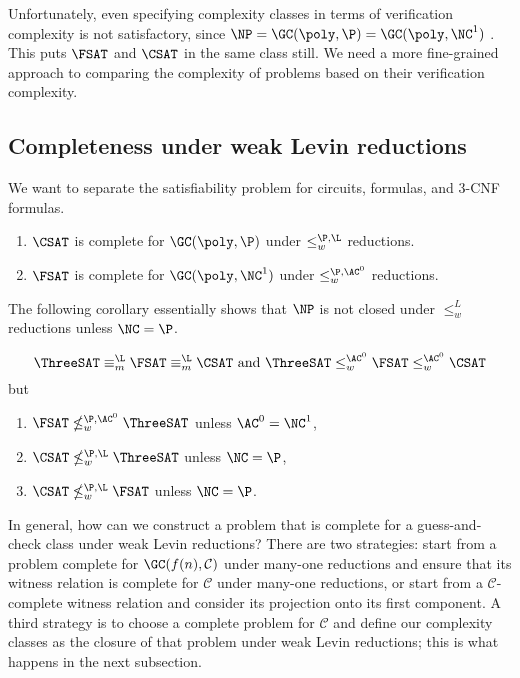 \documentclass{article}
\begin{document}
Unfortunately, even specifying complexity classes in terms of verification complexity is not satisfactory, since $\NP = \GC(\poly, \P) = \GC(\poly, \NC^1)$ \autocite[Theorem~2.2]{wolf94}.
This puts $\FSAT$ and $\CSAT$ in the same class still.
We need a more fine-grained approach to comparing the complexity of problems based on their verification complexity.

\subsection{Completeness under weak Levin reductions}

We want to separate the satisfiability problem for circuits, formulas, and 3-CNF formulas.

\begin{theorem}
  \mbox{}
  \begin{enumerate}
  \item $\CSAT$ is complete for $\GC(\poly, \P)$ under $\leq_w^{\P, \L}$ reductions.
  \item $\FSAT$ is complete for $\GC(\poly, \NC^1)$ under $\leq_w^{\P, \AC^0}$ reductions.
  \end{enumerate}
\end{theorem}

The following corollary essentially shows that $\NP$ is not closed under $\leq^L_w$ reductions unless $\NC = \P$.

\begin{corollary}
  \begin{equation*}
  \ThreeSAT \equiv_m^\L \FSAT \equiv_m^\L \CSAT
  \text{ and }
    \ThreeSAT \leq_w^{\AC^0} \FSAT \leq_w^{\AC^0} \CSAT
  \end{equation*}
  but
  \begin{enumerate}
  \item $\FSAT \nleq_w^{\P, \AC^0} \ThreeSAT$ unless $\AC^0 = \NC^1$,
  \item $\CSAT \nleq_w^{\P, \L} \ThreeSAT$ unless $\NC = \P$,
  \item $\CSAT \nleq_w^{\P, \L} \FSAT$ unless $\NC = \P$.
  \end{enumerate}
\end{corollary}

In general, how can we construct a problem that is complete for a guess-and-check class under weak Levin reductions?
There are two strategies: start from a problem complete for $\GC(f(n), \mathcal{C})$ under many-one reductions and ensure that its witness relation is complete for $\mathcal{C}$ under many-one reductions, or start from a $\mathcal{C}$-complete witness relation and consider its projection onto its first component.
A third strategy is to choose a complete problem for $\mathcal{C}$ and define our complexity classes as the closure of that problem under weak Levin reductions; this is what happens in the next subsection.
\end{document}
